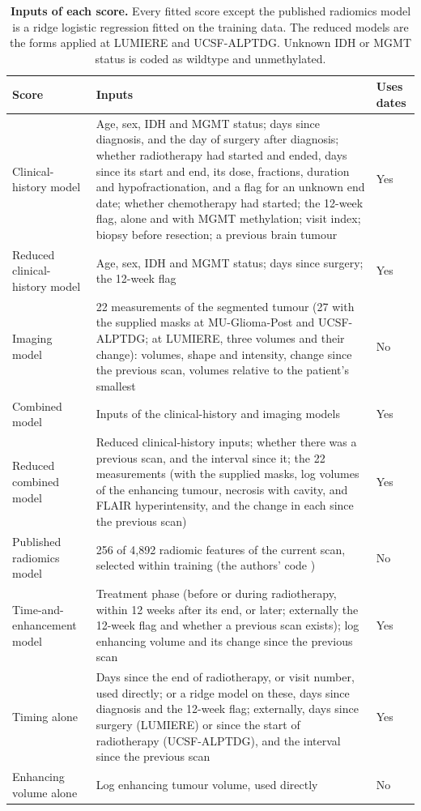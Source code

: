 \documentclass[largeformat]{interact} %
\begin{document}
\begin{table}[!htbp]
\centering
\caption[Inputs of each score]{\textbf{Inputs of each score.} Every fitted score except the published radiomics
model is a ridge logistic regression fitted on the training data. The reduced models are the forms applied at
LUMIERE and UCSF-ALPTDG. Unknown IDH or MGMT status is coded as wildtype and unmethylated.}
\label{tab:models}
\footnotesize
\zebrarows
\begin{tabularx}{\linewidth}{@{}R{3.4cm}LR{1.4cm}@{}}
\toprule
Score & Inputs & Uses dates \\
\midrule
Clinical-history model & Age, sex, IDH and MGMT status; days since diagnosis, and the day of surgery after diagnosis; whether radiotherapy had started and ended, days since its start and end, its dose, fractions, duration and hypofractionation, and a flag for an unknown end date; whether chemotherapy had started; the 12-week flag, alone and with MGMT methylation; visit index; biopsy before resection; a previous brain tumour & Yes \\
Reduced clinical-history model & Age, sex, IDH and MGMT status; days since surgery; the 12-week flag & Yes \\
Imaging model & 22 measurements of the segmented tumour (27 with the supplied masks at MU-Glioma-Post and UCSF-ALPTDG; at LUMIERE, three volumes and their change): volumes, shape and intensity, change since the previous scan, volumes relative to the patient's smallest & No \\
Combined model & Inputs of the clinical-history and imaging models & Yes \\
Reduced combined model & Reduced clinical-history inputs; whether there was a previous scan, and the interval since it; the 22 measurements (with the supplied masks, log volumes of the enhancing tumour, necrosis with cavity, and FLAIR hyperintensity, and the change in each since the previous scan) & Yes \\
\addlinespace
Published radiomics model & 256 of 4,892 radiomic features of the current scan, selected within training (the authors' code \citep{christodoulou2026code}) & No \\
Time-and-enhancement model & Treatment phase (before or during radiotherapy, within 12 weeks after its end, or later; externally the 12-week flag and whether a previous scan exists); log enhancing volume and its change since the previous scan & Yes \\
Timing alone & Days since the end of radiotherapy, or visit number, used directly; or a ridge model on these, days since diagnosis and the 12-week flag; externally, days since surgery (LUMIERE) or since the start of radiotherapy (UCSF-ALPTDG), and the interval since the previous scan & Yes \\
Enhancing volume alone & Log enhancing tumour volume, used directly & No \\
\bottomrule
\end{tabularx}
\end{table}
\end{document}
